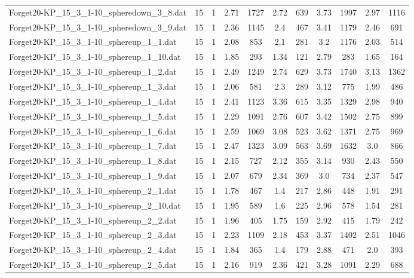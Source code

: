 \begin{table}[!ht]
\begin{tabular}{lcccccccccc}
Forget20-KP\_15\_3\_1-10\_spheredown\_3\_8.dat & 15 & 1 & 2.71 & 1727 & 2.72 & 639 & 3.73 & 1997 & 2.97 & 1116 \\
Forget20-KP\_15\_3\_1-10\_spheredown\_3\_9.dat & 15 & 1 & 2.36 & 1145 & 2.4 & 467 & 3.41 & 1179 & 2.46 & 691 \\
Forget20-KP\_15\_3\_1-10\_sphereup\_1\_1.dat & 15 & 1 & 2.08 & 853 & 2.1 & 281 & 3.2 & 1176 & 2.03 & 514 \\
Forget20-KP\_15\_3\_1-10\_sphereup\_1\_10.dat & 15 & 1 & 1.85 & 293 & 1.34 & 121 & 2.79 & 283 & 1.65 & 164 \\
Forget20-KP\_15\_3\_1-10\_sphereup\_1\_2.dat & 15 & 1 & 2.49 & 1249 & 2.74 & 629 & 3.73 & 1740 & 3.13 & 1362 \\
Forget20-KP\_15\_3\_1-10\_sphereup\_1\_3.dat & 15 & 1 & 2.06 & 581 & 2.3 & 289 & 3.12 & 775 & 1.99 & 486 \\
Forget20-KP\_15\_3\_1-10\_sphereup\_1\_4.dat & 15 & 1 & 2.41 & 1123 & 3.36 & 615 & 3.35 & 1329 & 2.98 & 940 \\
Forget20-KP\_15\_3\_1-10\_sphereup\_1\_5.dat & 15 & 1 & 2.29 & 1091 & 2.76 & 607 & 3.42 & 1502 & 2.75 & 899 \\
Forget20-KP\_15\_3\_1-10\_sphereup\_1\_6.dat & 15 & 1 & 2.59 & 1069 & 3.08 & 523 & 3.62 & 1371 & 2.75 & 969 \\
Forget20-KP\_15\_3\_1-10\_sphereup\_1\_7.dat & 15 & 1 & 2.47 & 1323 & 3.09 & 563 & 3.69 & 1632 & 3.0 & 866 \\
Forget20-KP\_15\_3\_1-10\_sphereup\_1\_8.dat & 15 & 1 & 2.15 & 727 & 2.12 & 355 & 3.14 & 930 & 2.43 & 550 \\
Forget20-KP\_15\_3\_1-10\_sphereup\_1\_9.dat & 15 & 1 & 2.07 & 679 & 2.34 & 369 & 3.0 & 734 & 2.37 & 547 \\
Forget20-KP\_15\_3\_1-10\_sphereup\_2\_1.dat & 15 & 1 & 1.78 & 467 & 1.4 & 217 & 2.86 & 448 & 1.91 & 291 \\
Forget20-KP\_15\_3\_1-10\_sphereup\_2\_10.dat & 15 & 1 & 1.95 & 589 & 1.6 & 225 & 2.96 & 578 & 1.54 & 281 \\
Forget20-KP\_15\_3\_1-10\_sphereup\_2\_2.dat & 15 & 1 & 1.96 & 405 & 1.75 & 159 & 2.92 & 415 & 1.79 & 242 \\
Forget20-KP\_15\_3\_1-10\_sphereup\_2\_3.dat & 15 & 1 & 2.23 & 1109 & 2.18 & 453 & 3.37 & 1402 & 2.51 & 1046 \\
Forget20-KP\_15\_3\_1-10\_sphereup\_2\_4.dat & 15 & 1 & 1.84 & 365 & 1.4 & 179 & 2.88 & 471 & 2.0 & 393 \\
Forget20-KP\_15\_3\_1-10\_sphereup\_2\_5.dat & 15 & 1 & 2.16 & 919 & 2.36 & 421 & 3.28 & 1091 & 2.29 & 688 \\

\end{tabular}
\end{table}
